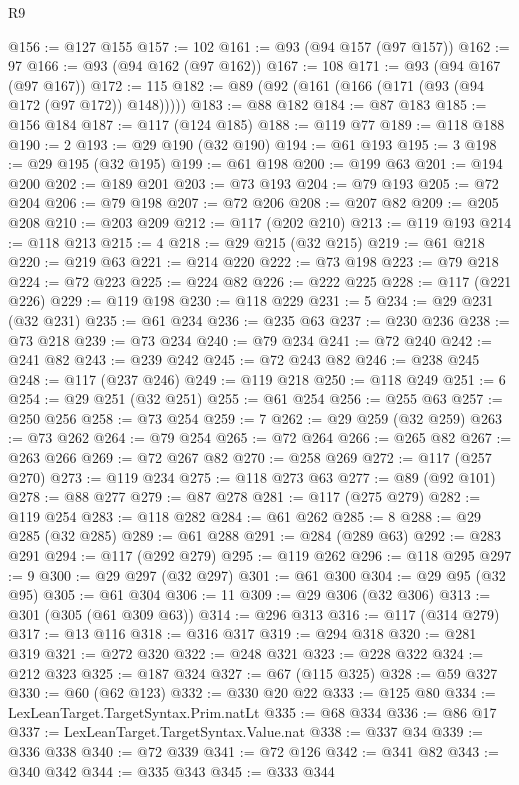 \begin{lexlean}{R9}
\begin{coremodule}
@156 := @127 @155
@157 := 102
@161 := @93 (@94 @157 (@97 @157))
@162 := 97
@166 := @93 (@94 @162 (@97 @162))
@167 := 108
@171 := @93 (@94 @167 (@97 @167))
@172 := 115
@182 := @89 (@92 (@161 (@166 (@171 (@93 (@94 @172 (@97 @172)) @148)))))
@183 := @88 @182
@184 := @87 @183
@185 := @156 @184
@187 := @117 (@124 @185)
@188 := @119 @77
@189 := @118 @188
@190 := 2
@193 := @29 @190 (@32 @190)
@194 := @61 @193
@195 := 3
@198 := @29 @195 (@32 @195)
@199 := @61 @198
@200 := @199 @63
@201 := @194 @200
@202 := @189 @201
@203 := @73 @193
@204 := @79 @193
@205 := @72 @204
@206 := @79 @198
@207 := @72 @206
@208 := @207 @82
@209 := @205 @208
@210 := @203 @209
@212 := @117 (@202 @210)
@213 := @119 @193
@214 := @118 @213
@215 := 4
@218 := @29 @215 (@32 @215)
@219 := @61 @218
@220 := @219 @63
@221 := @214 @220
@222 := @73 @198
@223 := @79 @218
@224 := @72 @223
@225 := @224 @82
@226 := @222 @225
@228 := @117 (@221 @226)
@229 := @119 @198
@230 := @118 @229
@231 := 5
@234 := @29 @231 (@32 @231)
@235 := @61 @234
@236 := @235 @63
@237 := @230 @236
@238 := @73 @218
@239 := @73 @234
@240 := @79 @234
@241 := @72 @240
@242 := @241 @82
@243 := @239 @242
@245 := @72 @243 @82
@246 := @238 @245
@248 := @117 (@237 @246)
@249 := @119 @218
@250 := @118 @249
@251 := 6
@254 := @29 @251 (@32 @251)
@255 := @61 @254
@256 := @255 @63
@257 := @250 @256
@258 := @73 @254
@259 := 7
@262 := @29 @259 (@32 @259)
@263 := @73 @262
@264 := @79 @254
@265 := @72 @264
@266 := @265 @82
@267 := @263 @266
@269 := @72 @267 @82
@270 := @258 @269
@272 := @117 (@257 @270)
@273 := @119 @234
@275 := @118 @273 @63
@277 := @89 (@92 @101)
@278 := @88 @277
@279 := @87 @278
@281 := @117 (@275 @279)
@282 := @119 @254
@283 := @118 @282
@284 := @61 @262
@285 := 8
@288 := @29 @285 (@32 @285)
@289 := @61 @288
@291 := @284 (@289 @63)
@292 := @283 @291
@294 := @117 (@292 @279)
@295 := @119 @262
@296 := @118 @295
@297 := 9
@300 := @29 @297 (@32 @297)
@301 := @61 @300
@304 := @29 @95 (@32 @95)
@305 := @61 @304
@306 := 11
@309 := @29 @306 (@32 @306)
@313 := @301 (@305 (@61 @309 @63))
@314 := @296 @313
@316 := @117 (@314 @279)
@317 := @13 @116
@318 := @316 @317
@319 := @294 @318
@320 := @281 @319
@321 := @272 @320
@322 := @248 @321
@323 := @228 @322
@324 := @212 @323
@325 := @187 @324
@327 := @67 (@115 @325)
@328 := @59 @327
@330 := @60 (@62 @123)
@332 := @330 @20 @22
@333 := @125 @80
@334 := LexLeanTarget.TargetSyntax.Prim.natLt
@335 := @68 @334
@336 := @86 @17
@337 := LexLeanTarget.TargetSyntax.Value.nat
@338 := @337 @34
@339 := @336 @338
@340 := @72 @339
@341 := @72 @126
@342 := @341 @82
@343 := @340 @342
@344 := @335 @343
@345 := @333 @344

\end{coremodule}
\end{lexlean}

